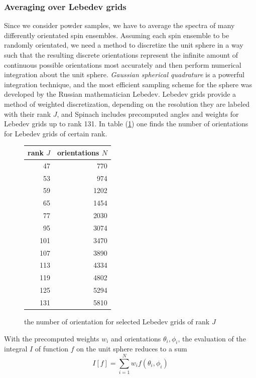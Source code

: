 \documentclass[11.5pt,a4paper]{article}
\begin{document}
\subsubsection{Averaging over Lebedev grids}
Since we consider powder samples, we have to average the spectra of many differently orientated spin ensembles. Assuming each spin ensemble to be randomly orientated, we need a method to discretize the unit sphere in a way such that the resulting discrete orientations represent the infinite amount of continuous possible orientations most accurately and then perform numerical integration about the unit sphere. \emph{Gaussian spherical quadrature} is a powerful integration technique, and the most efficient sampling scheme for the sphere was developed by the Russian mathematician Lebedev. Lebedev grids provide a method of weighted discretization, depending on the resolution they are labeled with their rank $J$, and Spinach includes precomputed angles and weights for Lebedev grids up to rank 131. In table (\ref{tab-lebedev}) one finds the number of orientations for Lebedev grids of certain rank. 

\begin{figure}
  \begin{center}
 \begin{tabular}{|r|r|}
  \hline
  rank $J$	& orientations $N$ \\
  \hline
  47		& 770 \\
  53		& 974 \\
  59		& 1202 \\
  65		& 1454 \\
  77		& 2030 \\
  95		& 3074 \\
  101		& 3470 \\
  107		& 3890 \\
  113		& 4334 \\
  119		& 4802 \\
  125		& 5294 \\
  131		& 5810 \\
  \hline
 \end{tabular}
\caption{the number of orientation for selected Lebedev grids of rank $J$}
\label{tab-lebedev}
  \end{center}
\end{figure}
With the precomputed weights $w_i$ and orientations $\theta_i, \phi_i$, the evaluation of the integral $I$ of function $f$ on the unit sphere reduces to a sum
\begin{equation}
 I[f] = \sum_{i=1}^N w_i f(\theta_i,\phi_i)
\end{equation}
\end{document}
